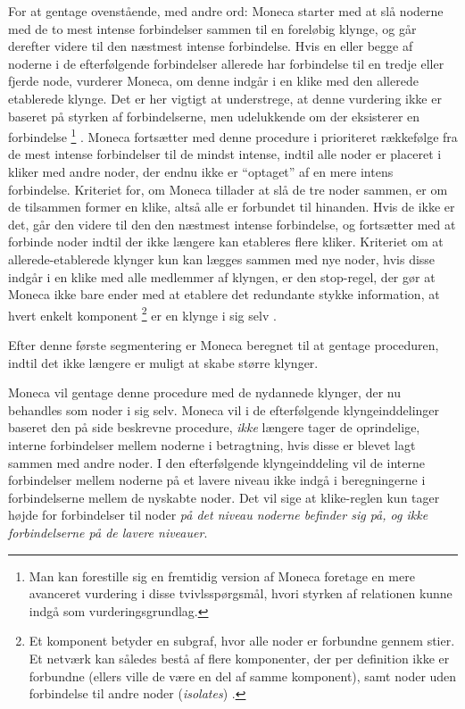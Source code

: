 For at gentage ovenstående, med andre ord: Moneca starter med at slå noderne med de to mest intense forbindelser sammen til en foreløbig klynge, og går derefter videre til den næstmest intense forbindelse. Hvis en eller begge af noderne i de efterfølgende forbindelser allerede har forbindelse til en tredje eller fjerde node, vurderer Moneca, om denne indgår i en klike med den allerede etablerede klynge. Det er her vigtigt at understrege, at denne vurdering ikke er baseret på styrken af forbindelserne, men udelukkende om der eksisterer en forbindelse%
%
\footnote{Man kan forestille sig en fremtidig version af Moneca foretage en mere avanceret vurdering i disse tvivlsspørgsmål, hvori styrken af relationen kunne indgå som vurderingsgrundlag.}
%
. Moneca fortsætter med denne procedure i prioriteret rækkefølge fra de mest intense forbindelser til de mindst intense, indtil alle noder er placeret i kliker med andre noder, der endnu ikke er “optaget” af en mere intens forbindelse. Kriteriet for, om Moneca tillader at slå de tre noder sammen, er om de tilsammen former en klike, altså alle er forbundet til hinanden. Hvis de ikke er det, går den videre til den den næstmest intense forbindelse, og fortsætter med at forbinde noder indtil der ikke længere kan etableres flere kliker. Kriteriet om at allerede-etablerede klynger kun kan lægges sammen med nye noder, hvis disse indgår i en klike med alle medlemmer af klyngen, er den stop-regel, der gør at Moneca ikke bare ender med at etablere det redundante stykke information, at hvert enkelt komponent%
%
\footnote{Et komponent betyder en subgraf, hvor alle noder er forbundne gennem stier. Et netværk kan således bestå af flere komponenter, der per definition ikke er forbundne (ellers ville de være en del af samme komponent), samt noder uden forbindelse til andre noder (\emph{isolates}) \parencite[100]{Scott2000}.}%
er en klynge i sig selv \parencite[8]{Touboel2015}. 

Efter denne  første segmentering er Moneca beregnet til at gentage proceduren, indtil det ikke længere er muligt at skabe større klynger. 

Moneca vil gentage denne procedure med de nydannede klynger, der nu behandles som noder i sig selv. Moneca vil i de efterfølgende klyngeinddelinger baseret den på side \pageref{monecastepbystep} beskrevne procedure, \emph{ikke} længere tager de oprindelige, interne forbindelser mellem noderne i betragtning, hvis disse er blevet lagt sammen med andre noder. I den efterfølgende klyngeinddeling vil de interne forbindelser mellem noderne på et lavere niveau ikke indgå i beregningerne i forbindelserne mellem de nyskabte noder. Det vil sige at klike-reglen kun tager højde for forbindelser til noder \emph{på det niveau noderne befinder sig på, og ikke forbindelserne på de lavere niveauer}. 

